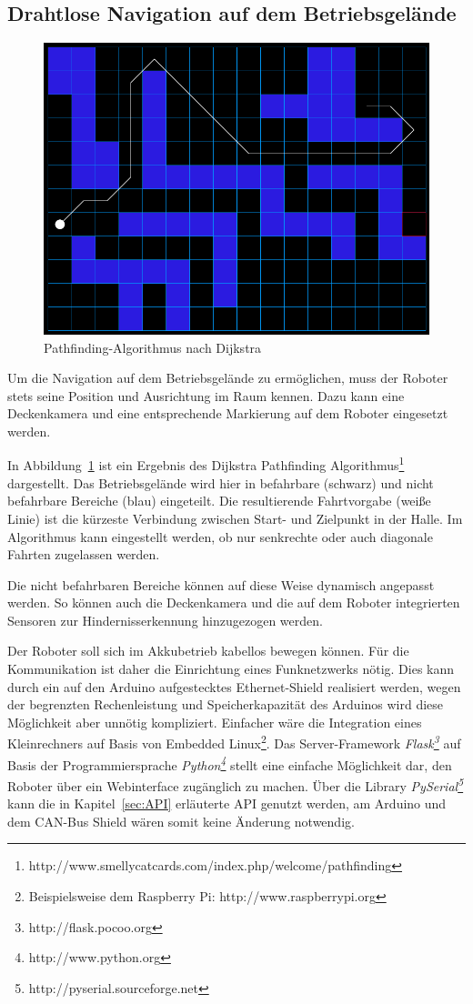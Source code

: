 \subsection{Drahtlose Navigation auf dem Betriebsgelände}
\label{sec:Navigation}
\begin{figure}
\centering
    \includegraphics[width=.8\textwidth]{Abbildungen/Dijkstra}
    \caption[Dijkstra]{Pathfinding-Algorithmus nach Dijkstra}
    \label{fig:Dijkstra}
\end{figure}
Um die Navigation auf dem Betriebsgelände zu ermöglichen, muss der Roboter stets seine Position und Ausrichtung im Raum kennen. Dazu kann eine Deckenkamera und eine entsprechende Markierung auf dem Roboter eingesetzt werden.

In Abbildung~\ref{fig:Dijkstra} ist ein Ergebnis des Dijkstra Pathfinding Algorithmus\footnote{http://www.smellycatcards.com/index.php/welcome/pathfinding} dargestellt.
Das Betriebsgelände wird hier in befahrbare (schwarz) und nicht befahrbare Bereiche (blau) eingeteilt. Die resultierende Fahrtvorgabe (weiße Linie) ist die kürzeste Verbindung zwischen Start- und Zielpunkt in der Halle. Im Algorithmus kann eingestellt werden, ob nur senkrechte oder auch diagonale Fahrten zugelassen werden.

Die nicht befahrbaren Bereiche können auf diese Weise dynamisch angepasst werden. So können auch die Deckenkamera und die auf dem Roboter integrierten Sensoren zur Hindernisserkennung hinzugezogen werden.

Der Roboter soll sich im Akkubetrieb kabellos bewegen können. Für die Kommunikation ist daher die Einrichtung eines Funknetzwerks nötig. Dies kann durch ein auf den Arduino aufgestecktes Ethernet-Shield realisiert werden, wegen der begrenzten Rechenleistung und Speicherkapazität des Arduinos wird diese Möglichkeit aber unnötig kompliziert.
Einfacher wäre die Integration eines Kleinrechners auf Basis von Embedded Linux\footnote{Beispielsweise dem Raspberry Pi: http://www.raspberrypi.org}. Das Server-Framework \emph{Flask\footnote{http://flask.pocoo.org}} auf Basis der Programmiersprache \emph{Python\footnote{http://www.python.org}} stellt eine einfache Möglichkeit dar, den Roboter über ein Webinterface zugänglich zu machen. Über die Library \emph{PySerial\footnote{http://pyserial.sourceforge.net}} kann die in Kapitel~\ref{sec:API} erläuterte API genutzt werden, am Arduino und dem CAN-Bus Shield wären somit keine Änderung notwendig.


